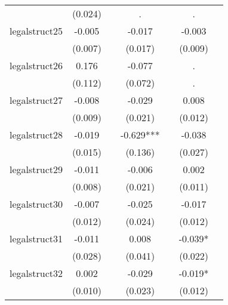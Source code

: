 {\begin{tabular}{l*{6}{c}}
            &     (0.024)   &               &           .   &               &           .   &               \\
[1em]
legalstruct25&      -0.005   &               &      -0.017   &               &      -0.003   &               \\
            &     (0.007)   &               &     (0.017)   &               &     (0.009)   &               \\
[1em]
legalstruct26&       0.176   &               &      -0.077   &               &           .   &               \\
            &     (0.112)   &               &     (0.072)   &               &           .   &               \\
[1em]
legalstruct27&      -0.008   &               &      -0.029   &               &       0.008   &               \\
            &     (0.009)   &               &     (0.021)   &               &     (0.012)   &               \\
[1em]
legalstruct28&      -0.019   &               &      -0.629***&               &      -0.038   &               \\
            &     (0.015)   &               &     (0.136)   &               &     (0.027)   &               \\
[1em]
legalstruct29&      -0.011   &               &      -0.006   &               &       0.002   &               \\
            &     (0.008)   &               &     (0.021)   &               &     (0.011)   &               \\
[1em]
legalstruct30&      -0.007   &               &      -0.025   &               &      -0.017   &               \\
            &     (0.012)   &               &     (0.024)   &               &     (0.012)   &               \\
[1em]
legalstruct31&      -0.011   &               &       0.008   &               &      -0.039*  &               \\
            &     (0.028)   &               &     (0.041)   &               &     (0.022)   &               \\
[1em]
legalstruct32&       0.002   &               &      -0.029   &               &      -0.019*  &               \\
            &     (0.010)   &               &     (0.023)   &               &     (0.012)   &               \\

\end{tabular}}
